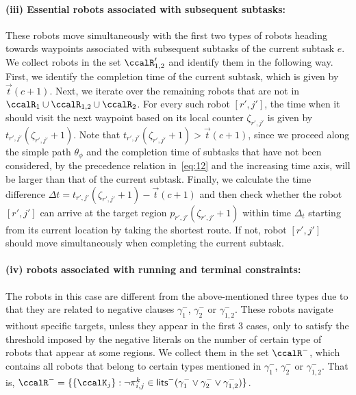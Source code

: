 \documentclass[Afour,sageh,times]{sagej}
\renewcommand{\ap}[3]{\mathcal{\pi}_{{#1},{#2}}^{#3}}
\begin{document}
\paragraph{(iii) Essential robots associated with subsequent subtasks:} These robots move simultaneously with the first two types of robots heading towards  waypoints associated with subsequent subtasks of the current subtask $e$. We collect robots in the set $\ccalR'_{1,2}$ and identify them in the following way. First, we identify the completion time  of the current subtask, which is given by $\vec{t}(c+1)$.  Next, we iterate over the remaining robots that are not in $\ccalR_1 \cup \ccalR_{1,2} \cup \ccalR_2$. For every such robot $[r',j']$, the time when it should visit the next waypoint based on its local counter $\zeta_{r',j'}$ is given by $t_{r',j'}(\zeta_{r',j'}+1)$. Note that {$t_{r', j'}(\zeta_{r',j'}+1) > \vec{t}(c+1)$}, since we proceed along the simple path $\theta_\phi$ and the completion time of  subtasks that have not been considered, by the precedence relation in~\eqref{eq:12} and the increasing time axis, will be larger than that of the current subtask. Finally, we calculate the time difference $\Delta t = t_{r', j'}(\zeta_{r',j'}+1) - \vec{t}(c+1)$  and then check whether the robot $[r', j']$ can arrive at the target region $p_{r',j'}(\zeta_{r',j'}+1)$  within time $\Delta_t$ starting from  its current location by taking the shortest route. {If not, robot $[r', j']$ should move simultaneously when completing the current subtask.}
\paragraph{(iv) robots associated with running and terminal constraints:} The robots in this case  are different from the above-mentioned three types due to that they are related to negative clauses $\gamma_1^-$, $\gamma_2^-$ or $\gamma_{1,2}^-$. These robots navigate without specific targets, unless they appear in the first 3 cases, only to satisfy the threshold imposed by the negative literals on the number of certain type of robots that appear at some regions. We collect them in the set $\ccalR^-$, which contains all robots that belong to certain types mentioned in $\gamma_1^-$, $\gamma_2^-$ or $\gamma_{1,2}^-$. That is, $\ccalR^- = \{\{\ccalK_j\}: \neg \ap{i}{j}{k} \in \mathsf{lits}^- (\gamma_1^- \vee \gamma_2^- \vee \gamma_{1,2}^-) \}$.
\end{document}
